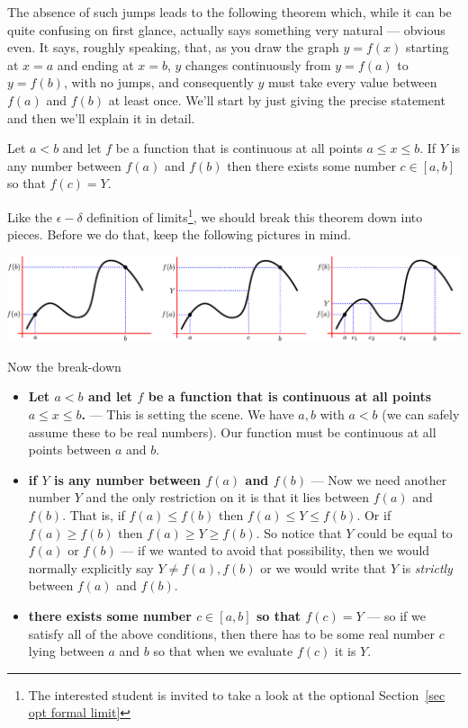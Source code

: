 The absence of such jumps leads to the following theorem which, while it can be
quite confusing on first glance, actually says something very natural ---
obvious even. It says, roughly speaking, that, as you draw the graph $y=f(x)$ starting at
$x=a$ and ending at $x=b$, $y$ changes continuously from $y=f(a)$ to $y=f(b)$, with no
jumps, and consequently $y$ must take every value between $f(a)$ and $f(b)$ at least once.
We'll start by just giving the precise statement and then we'll explain it in detail.
\begin{theorem}
\label{thm ivt}
Let $a<b$ and let $f$ be a function that is continuous at all points $a\leq x
\leq b$. If $Y$ is any number between $f(a)$ and $f(b)$ then there exists some
number $c \in [a,b]$ so that $f(c) = Y$.
\end{theorem}
Like the $\epsilon-\delta$ definition of limits\footnote{The interested student is
invited to take a look at the optional Section~\ref{sec opt formal limit}}, we should
break this
theorem down into pieces. Before we do that, keep the following pictures in mind.
\begin{fig}
\begin{center}
 \includegraphics[width=\textwidth]{IVT}
\end{center}
\end{fig}
Now the break-down
\begin{itemize}
 \item \textbf{Let $a<b$ and let $f$ be a function that is continuous at all
points $a\leq x \leq b$.} --- This is setting the scene. We have $a,b$ with
$a<b$ (we can safely assume these to be real numbers). Our function must
be continuous at all points between $a$ and $b$.

\item \textbf{if $Y$ is any number between $f(a)$ and $f(b)$} --- Now we need
another number $Y$ and the only restriction on it is that it lies between
$f(a)$ and $f(b)$. That is, if $f(a)\leq f(b)$ then $f(a) \leq Y \leq f(b)$. Or
if $f(a) \geq f(b)$ then $f(a) \geq Y \geq f(b)$. So notice that $Y$ could be
equal to $f(a)$ or $f(b)$ --- if we wanted to avoid that possibility, then we
would normally explicitly say $Y \neq f(a), f(b)$ or we would write that $Y$
is \emph{strictly} between $f(a)$ and $f(b)$.

\item \textbf{there exists some number $c \in [a,b]$ so that $f(c) = Y$} --- so
if we satisfy all of the above conditions, then there has to be some real
number $c$ lying between $a$ and $b$ so that when we evaluate $f(c)$ it is $Y$.
\end{itemize}
